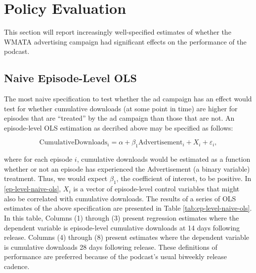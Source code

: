 \documentclass[11pt, letterpaper, twoside]{article}
\begin{document}
\section{Policy Evaluation}
This section will report increasingly well-specified estimates of whether the WMATA advertising campaign had significant effects on the performance of the podcast.

\subsection{Naive Episode-Level OLS}
The most naive specification to test whether the ad campaign has an effect would test for whether cumulative downloads (at some point in time) are higher for episodes that are ``treated'' by the ad campaign than those that are not. An episode-level OLS estimation as decribed above may be specified as follows:

\begin{equation}
  \label{ep-level-naive-ols}
  \text{CumulativeDownloads}_i = \alpha + \beta_1\text{Advertisement}_i + X_i +\varepsilon_i, 
\end{equation}

where for each episode $i$, cumulative downloads would be estimated as a function whether or not an episode has experienced the Advertisement (a binary variable) treatment. Thus, we would expect $\beta_1$, the coefficient of interest, to be positive. In \eqref{ep-level-naive-ols}, $X_i$ is a vector of episode-level control variables that might also be correlated with cumulative downloads. The results of a series of OLS estimates of the above specification are presented in Table \ref{tab:ep-level-naive-ols}. In this table, Columns (1) through (3) present regression estimates where the dependent variable is episode-level cumulative downloads at 14 days following release. Columns (4) through (8) present estimates where the dependent variable is cumulative downloads 28 days following release. These definitions of performance are preferred because of the podcast's usual biweekly release cadence.\\

\begin{landscape}
  
\end{landscape}
\end{document}

